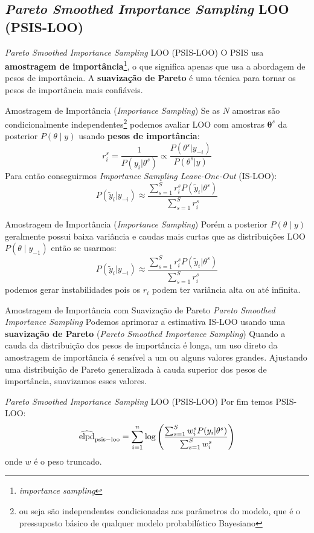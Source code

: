 \subsection{\textit{Pareto Smoothed Importance Sampling} LOO (PSIS-LOO)}
\begin{frame}{\textit{Pareto Smoothed Importance Sampling} LOO (PSIS-LOO)}
	O PSIS usa \textbf{amostragem de importância}\footnote{\textit{importance sampling}},
	o que significa apenas que usa a abordagem de pesos de importância.
	\vfill
	A \textbf{suavização de Pareto} é uma técnica para tornar os pesos de importância
	mais confiáveis.
\end{frame}
\begin{frame}{Amostragem de Importância (\textit{Importance Sampling})}
	Se as $N$ amostras são condicionalmente independentes\footnote{ou seja
		são independentes condicionadas aos parâmetros do modelo, que é o pressuposto
		básico de qualquer modelo probabilístico Bayesiano} \parencite{gelfand1992model}
	podemos avaliar LOO com amostras $\boldsymbol{\theta}^s$ da posterior
	$P(\theta \mid y)$ usando \textbf{pesos de importância}:
	$$
		r_i^s=\frac{1}{P(y_i|\theta^s)} \propto \frac{P(\theta^s|y_{-i})}{P(\theta^s|y)}
	$$
	Para então conseguirmos \textit{Importance Sampling Leave-One-Out} (IS-LOO):
	$$
		P(\tilde{y}_i|y_{-i})
		\approx
		\frac{\sum_{s=1}^S r_i^s P(\tilde{y}_i|\theta^s)}{\sum_{s=1}^S r_i^s}
	$$
\end{frame}

\begin{frame}{Amostragem de Importância (\textit{Importance Sampling})}
	Porém a posterior $P(\theta \mid y)$ geralmente possui baixa variância e caudas
	mais curtas que as distribuições LOO $P(\theta \mid y_{-1})$ então se usarmos:
	$$
		P(\tilde{y}_i|y_{-i}) \approx \frac{\sum_{s=1}^S r_i^s P(\tilde{y}_i|\theta^s)}{\sum_{s=1}^S r_i^s}
	$$
	podemos gerar instabilidades pois os $r_i$ podem ter variância alta ou até infinita.
\end{frame}

\begin{frame}{Amostragem de Importância com Suavização de Pareto \textit{Pareto Smoothed Importance Sampling}}
	Podemos aprimorar a estimativa IS-LOO usando uma \textbf{suavização de Pareto}
	(\textit{Pareto Smoothed Importance Sampling}) \parencite{vehtariPracticalBayesianModel2015}
	\vfill
	Quando a cauda da distribuição dos pesos de importância é longa, um uso direto
	da amostragem de importância é sensível a um ou alguns valores grandes.
	Ajustando uma distribuição de Pareto generalizada à cauda superior dos pesos de
	importância, suavizamos esses valores.
\end{frame}
\begin{frame}{\textit{Pareto Smoothed Importance Sampling} LOO (PSIS-LOO)}
	Por fim temos PSIS-LOO:
	$$
		\widehat{\operatorname{elpd}}_{\rm psis-loo} =
		\sum_{i=1}^n \log
		\left(\frac{\sum_{s=1}^S w_i^s P(y_i|\theta^s)}{\sum_{s=1}^Sw_i^s} \right)
	$$
	onde $w$ é o peso truncado.
\end{frame}

